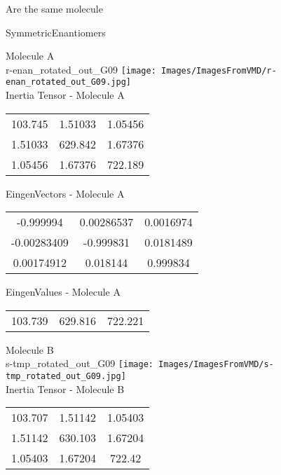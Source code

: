 \begin{center}
\vtab
\vtab
\textcolor{NavyBlue}{\Large Are the same molecule}
\end{center}
\newpage

\vtab[-2cm]
\begin{center}
{\large SymmetricEnantiomers}
\end{center}
\begin{multicols}{2}
\begin{center}
Molecule A \\ 
r-enan\_rotated\_out\_G09
\texttt{[image: Images/ImagesFromVMD/r-enan\_rotated\_out\_G09.jpg]}
\\
Inertia Tensor - Molecule A \\
\vtab
\begin{tabular}{|c c c|}
103.745	 & 	1.51033	 & 	1.05456	 \\
1.51033	 & 	629.842	 & 	1.67376	 \\
1.05456	 & 	1.67376	 & 	722.189
\end{tabular}

\vtab
 EingenVectors - Molecule A     \\
\vtab
\begin{tabular}{|c c c|}
-0.999994	 & 	0.00286537	 & 	0.0016974	 \\
-0.00283409	 & 	-0.999831	 & 	0.0181489	 \\
0.00174912	 & 	0.018144	 & 	0.999834
\end{tabular}

\vtab
 EingenValues - Molecule A     \\
\vtab
\begin{tabular}{|c c c|}
103.739	 & 	629.816	 & 	722.221
\end{tabular}
\columnbreak

Molecule B \\ 
s-tmp\_rotated\_out\_G09
\texttt{[image: Images/ImagesFromVMD/s-tmp\_rotated\_out\_G09.jpg]}
\\
Inertia Tensor - Molecule B \\
\vtab
\begin{tabular}{|c c c|}
103.707	 & 	1.51142	 & 	1.05403	 \\
1.51142	 & 	630.103	 & 	1.67204	 \\
1.05403	 & 	1.67204	 & 	722.42
\end{tabular}


\end{center}
\end{multicols}

